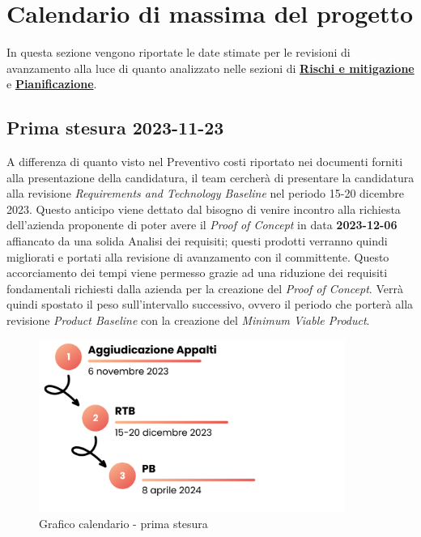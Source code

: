 \documentclass[10pt, a4paper]{article}
\begin{document}
{{{{{{\newpage

\section{Calendario di massima del progetto}
In questa sezione vengono riportate le date stimate per le revisioni di avanzamento alla luce di quanto analizzato nelle sezioni di \hyperref[section:Rischi]{\textbf{Rischi e mitigazione}} e \hyperref[section:Pianificazione]{\textbf{Pianificazione}}.

\subsection{Prima stesura 2023-11-23}
A differenza di quanto visto nel Preventivo costi riportato nei documenti forniti alla presentazione della candidatura, il team cercherà di presentare la candidatura alla revisione \textit{Requirements and Technology Baseline} nel periodo 15-20 dicembre 2023. Questo anticipo viene dettato dal bisogno di venire incontro alla richiesta dell'azienda proponente di poter avere il \textit{Proof of Concept} in data \textbf{2023-12-06} affiancato da una solida Analisi dei requisiti; questi prodotti verranno quindi migliorati e portati alla revisione di avanzamento con il committente.
 Questo accorciamento dei tempi viene permesso grazie ad una riduzione dei requisiti fondamentali richiesti dalla azienda per la creazione del \textit{Proof of Concept}. Verrà quindi spostato il peso sull'intervallo successivo, ovvero il periodo che porterà alla revisione \textit{Product Baseline} con la creazione del \textit{Minimum Viable Product}.

 \begin{figure}[H]
        \centering
        \includegraphics[width=10cm]{Calendario di massima - prima stesura.png}
        \caption{Grafico calendario - prima stesura}
    \end{figure}
}}}}}}
\end{document}
